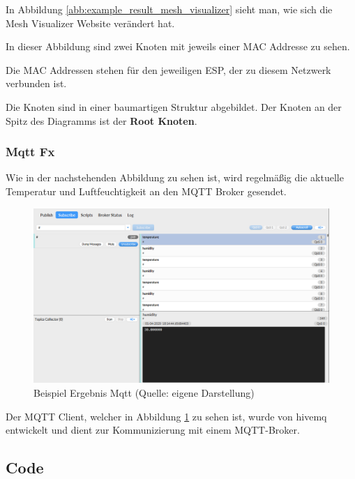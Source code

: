 In Abbildung \ref{abb:example_result_mesh_visualizer} sieht man, wie sich die Mesh Visualizer Website verändert hat.

In dieser Abbildung sind zwei Knoten mit jeweils einer MAC Addresse zu sehen.

Die MAC Addressen stehen für den jeweiligen ESP, der zu diesem Netzwerk verbunden ist.

Die Knoten sind in einer baumartigen Struktur abgebildet. Der Knoten an der Spitz des Diagramms ist der \textbf{Root Knoten}.

\subsubsection{Mqtt Fx}

Wie in der nachstehenden Abbildung zu sehen ist, wird regelmäßig die aktuelle Temperatur und Luftfeuchtigkeit an den MQTT Broker gesendet.

\begin{figure}[H]
    \begin{center}
        \includegraphics[scale=0.5]{images/example_result_mqtt.png}
        \caption{Beispiel Ergebnis Mqtt (Quelle: eigene Darstellung)}
        \label{abb:example_result_mqtt}
    \end{center}

\end{figure}

Der MQTT Client, welcher in Abbildung \ref{abb:example_result_mqtt} zu sehen ist, wurde von hivemq entwickelt und dient zur Kommunizierung mit einem MQTT-Broker.

\subsection{Code}\label{sec:code}
